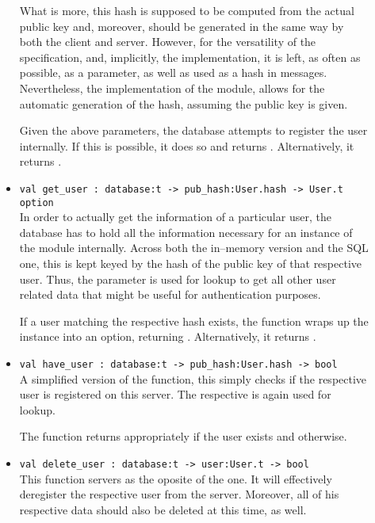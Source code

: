 \begin{description}
\begin{itemize}
  What is more, this hash is supposed to be computed from the actual public key and, moreover, should be generated in the same way by both the client and server.
  However, for the versatility of the specification, and, implicitly, the implementation, it is left, as often as possible, as a parameter, as well as used as a hash in messages.
  Nevertheless, the implementation of the  module, allows for the automatic generation of the hash, assuming the public key is given.

  Given the above parameters, the database attempts to register the user internally.
  If this is possible, it does so and returns .
  Alternatively, it returns .

  \item \verb|val get_user : database:t -> pub_hash:User.hash -> User.t option| \\
  In order to actually get the information of a particular user, the database has to hold all the information necessary for an instance of the  module internally.
  Across both the in--memory version and the SQL one, this is kept keyed by the hash of the public key of that respective user.
  Thus, the parameter  is used for lookup to get all other user related data that might be useful for authentication purposes.

  If a user matching the respective hash exists, the function wraps up the  instance into an option, returning .
  Alternatively, it returns .

  \item \verb|val have_user : database:t -> pub_hash:User.hash -> bool| \\
  A simplified version of the  function, this simply checks if the respective user is registered on this server.
  The respective  is again used for lookup.

  The function returns appropriately  if the user exists and  otherwise.

  \item \verb|val delete_user : database:t -> user:User.t -> bool| \\
  This function servers as the oposite of the  one.
  It will effectively deregister the respective user from the server.
  Moreover, all of his respective data should also be deleted at this time, as well.


\end{itemize}
\end{description}
